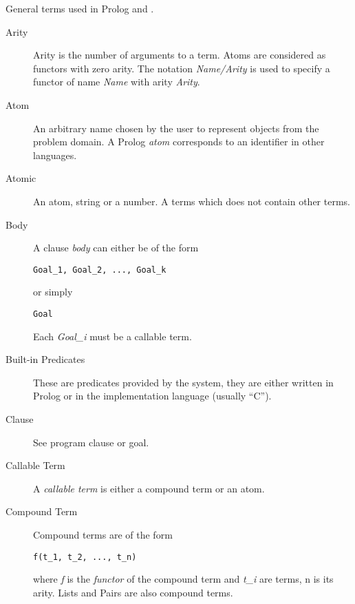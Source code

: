 General terms used in Prolog and \eclipse.
\begin{description}
\item[Arity]	
Arity is the number of arguments to a term.
Atoms are considered as functors with zero arity.
The notation {\it Name/Arity} is used to specify a functor of name 
{\it Name} with arity {\it Arity}.

\item[Atom]
An arbitrary name chosen by the user to represent objects from the 
problem domain.
A Prolog {\it atom} corresponds to an identifier in other languages.

\item[Atomic]
An atom, string or a number. A terms which does not contain other terms.

\item[Body]
A clause {\it body} can either be of the form
\begin{verbatim}
Goal_1, Goal_2, ..., Goal_k
\end{verbatim}
or simply
\begin{verbatim}
Goal
\end{verbatim}
Each {\it Goal_i} must be  a callable term.

\item[Built-in Predicates]
These are predicates provided by the
{\eclipse} system, they are either written in Prolog or in the implementation
language (usually ``C'').


\item[Clause]
See program clause or goal.

\item[Callable Term]
A {\it callable term} is either a compound term or an atom.

\item[Compound Term]
Compound terms are of the form
\begin{verbatim}
f(t_1, t_2, ..., t_n)
\end{verbatim}
where {\it f} is the {\it functor} of the compound term
and {\it t_i} are terms, n is its arity. Lists and Pairs are also 
compound terms.


\end{description}
